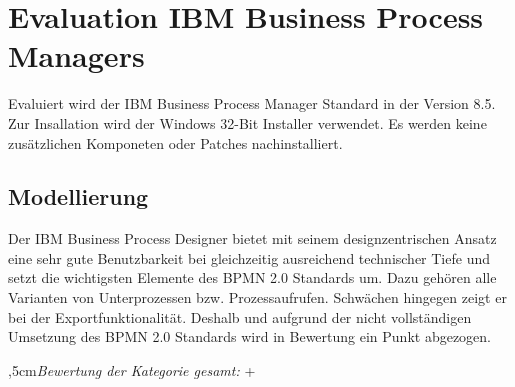 \newpage
\section{Evaluation IBM Business Process Managers}
\label{evaluationIBM}
Evaluiert wird der IBM Business Process Manager Standard in der Version 8.5. Zur Insallation wird der Windows 32-Bit Installer verwendet. Es werden keine zusätzlichen Komponeten oder Patches nachinstalliert.

\subsection{Modellierung}

Der IBM Business Process Designer bietet mit seinem designzentrischen Ansatz eine sehr gute Benutzbarkeit bei gleichzeitig ausreichend technischer Tiefe und setzt die wichtigsten Elemente des \ac{BPMN} 2.0 Standards um. Dazu gehören alle Varianten von Unterprozessen bzw. Prozessaufrufen. Schwächen hingegen zeigt er bei der Exportfunktionalität. Deshalb und aufgrund der nicht vollständigen Umsetzung des \ac{BPMN} 2.0 Standards wird in Bewertung ein Punkt abgezogen.

\bigskip{},5cm\textit{Bewertung der Kategorie gesamt:} \hspace{5mm} \textcircled{+}
\leftskip=0cm

